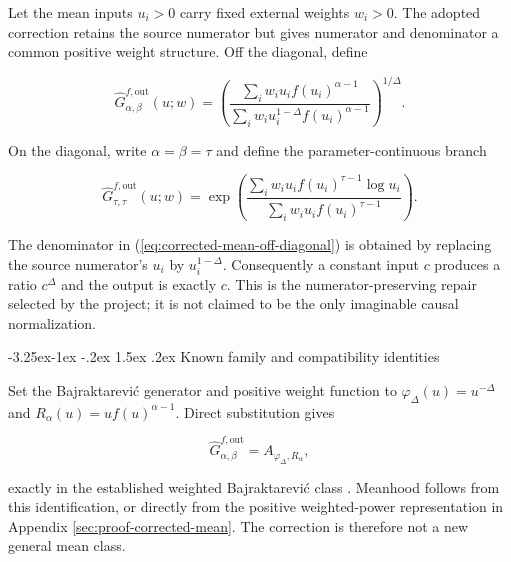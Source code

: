 \documentclass[12pt,a4paper,oneside]{report}
\makeatletter
\renewcommand\subsection{\@startsection{subsection}{2}{\z@}%
  {-3.25ex\@plus -1ex \@minus -.2ex}%
  {1.5ex \@plus .2ex}%
  {\normalfont\fontsize{12}{15}\selectfont\bfseries}}
\makeatother
\begin{document}
Let the mean inputs $u_i>0$ carry fixed external weights $w_i>0$. The adopted
correction retains the source numerator but gives numerator and denominator a
common positive weight structure. Off the diagonal, define

\begin{equation}
  \widehat G_{\alpha,\beta}^{f,\mathrm{out}}(u;w)
  =\left(
    \frac{\sum_i w_i u_i f(u_i)^{\alpha-1}}
         {\sum_i w_i u_i^{1-\Delta}f(u_i)^{\alpha-1}}
   \right)^{1/\Delta}.
  \label{eq:corrected-mean-off-diagonal}
\end{equation}

On the diagonal, write $\alpha=\beta=\tau$ and define the
parameter-continuous branch

\begin{equation}
  \widehat G_{\tau,\tau}^{f,\mathrm{out}}(u;w)
  =\exp\left(
    \frac{\sum_i w_i u_i f(u_i)^{\tau-1}\log u_i}
         {\sum_i w_i u_i f(u_i)^{\tau-1}}
  \right).
  \label{eq:corrected-mean-diagonal}
\end{equation}

The denominator in (\ref{eq:corrected-mean-off-diagonal}) is obtained by
replacing the source numerator's $u_i$ by $u_i^{1-\Delta}$. Consequently a
constant input $c$ produces a ratio $c^\Delta$ and the output is exactly $c$.
This is the numerator-preserving repair selected by the project; it is not
claimed to be the only imaginable causal normalization.

\subsection{Known family and compatibility identities}
\label{sec:corrected-family-identification}

Set the Bajraktarevi\'c generator and positive weight function to
$\varphi_\Delta(u)=u^{-\Delta}$ and
$R_\alpha(u)=u f(u)^{\alpha-1}$. Direct substitution gives

\begin{equation}
  \widehat G_{\alpha,\beta}^{f,\mathrm{out}}
  =A_{\varphi_\Delta,R_\alpha},
  \label{eq:corrected-bajraktarevic}
\end{equation}

exactly in the established weighted Bajraktarevi\'c class
\citep{bajraktarevic1958,paleszakaria2020}. Meanhood follows from this
identification, or directly from the positive weighted-power representation in
Appendix \ref{sec:proof-corrected-mean}. The correction is therefore not a new
general mean class.
\end{document}
